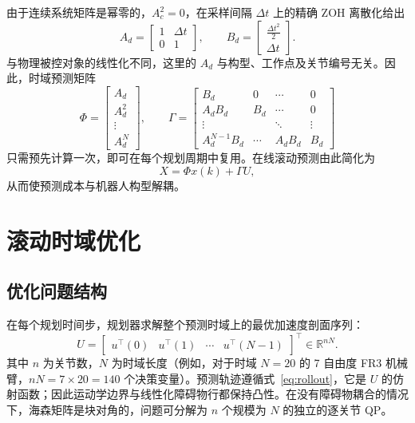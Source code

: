 由于连续系统矩阵是幂零的，\(A_c^2=0\)，在采样间隔 \(\Delta t\) 上的精确 ZOH 离散化给出
\begin{equation}
\label{eq:zoh}
A_d = \begin{bmatrix} 1 & \Delta t \\ 0 & 1 \end{bmatrix}, \qquad
B_d = \begin{bmatrix} \frac{\Delta t^2}{2} \\ \Delta t \end{bmatrix}.
\end{equation}
与物理被控对象的线性化不同，这里的 \(A_d\) 与构型、工作点及关节编号无关。因此，时域预测矩阵
\begin{equation}
\label{eq:prediction-matrices}
\Phi = \begin{bmatrix} A_d \\ A_d^2 \\ \vdots \\ A_d^N \end{bmatrix}, \qquad
\Gamma = \begin{bmatrix}
B_d & 0 & \cdots & 0 \\
A_d B_d & B_d & \cdots & 0 \\
\vdots & & \ddots & \vdots \\
A_d^{N-1} B_d & \cdots & A_d B_d & B_d
\end{bmatrix}
\end{equation}
只需预先计算一次，即可在每个规划周期中复用。在线滚动预测由此简化为
\begin{equation}
\label{eq:rollout}
X=\Phi x(k)+\Gamma U,
\end{equation}
从而使预测成本与机器人构型解耦。

\section{滚动时域优化}\label{iii.-receding-horizon-optimization-layer-2-qp-planner}

\subsection{优化问题结构}\label{a.-optimization-problem-structure}

在每个规划时间步，规划器求解整个预测时域上的最优加速度剖面序列：
\begin{equation}
\label{eq:decision-vector}
U = \begin{bmatrix} u^\top(0) & u^\top(1) & \cdots & u^\top(N-1) \end{bmatrix}^\top
\in \mathbb{R}^{nN}.
\end{equation}
其中 \(n\) 为关节数，\(N\) 为时域长度（例如，对于时域 \(N=20\) 的 7 自由度 FR3 机械臂，\(nN = 7\times 20 = 140\) 个决策变量）。预测轨迹遵循式~\eqref{eq:rollout}，它是 \(U\) 的仿射函数；因此运动学边界与线性化障碍物行都保持凸性。在没有障碍物耦合的情况下，海森矩阵是块对角的，问题可分解为 \(n\) 个规模为 \(N\) 的独立的逐关节 QP。

